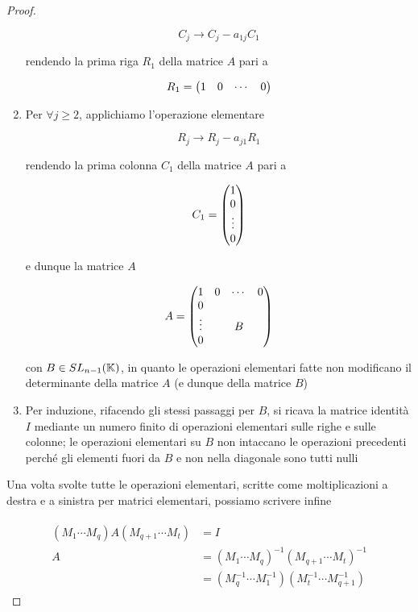 \begin{proof}
\begin{enumerate}
		\begin{equation}
			C_{j} \to C_{j} - a_{1j} C_{1}
		\end{equation}
	
		rendendo la prima riga $ R_{1} $ della matrice $ A $ pari a 
		
		\begin{equation}
			R_{1} = \mqty(\dmat{ 1 & 0 & \cdots & 0 })
		\end{equation}
		
		\item Per $ \forall j \geqslant 2 $, applichiamo l'operazione elementare
		
		\begin{equation}
			R_{j} \to R_{j} - a_{j1} R_{1}
		\end{equation}
		
		rendendo la prima colonna $ C_{1} $ della matrice $ A $ pari a 
		
		\begin{equation}
			C_{1} = \mqty(\dmat{ 1 \\ 0 \\ \vdots \\ 0 })
		\end{equation}
	
		e dunque la matrice $ A $
		
		\begin{equation}
			A = %
			\mqty(\dmat{ 1 & 0 & \cdots & 0 \\ %
							0 & & & \\ %
							\vdots & & B &\\ %
							0 & & & })
		\end{equation}
	
		con $ B \in SL_{n-1}(\mathbb{K}) $, in quanto le operazioni elementari fatte non modificano il determinante della matrice $ A $ (e dunque della matrice $ B $)
		
		\item Per induzione, rifacendo gli stessi passaggi per $ B $, si ricava la matrice identità $ I $ mediante un numero finito di operazioni elementari sulle righe e sulle colonne; le operazioni elementari su $ B $ non intaccano le operazioni precedenti perché gli elementi fuori da $ B $ e non nella diagonale sono tutti nulli
	\end{enumerate}

	Una volta svolte tutte le operazioni elementari, scritte come moltiplicazioni a destra e a sinistra per matrici elementari, possiamo scrivere infine
	
	\begin{align}
		\begin{split}
			(M_{1} \cdots M_{q}) A (M_{q+1} \cdots M_{t}) &= I\\
			A &= (M_{1} \cdots M_{q})^{-1} (M_{q+1} \cdots M_{t})^{-1}\\
			&= (M_{q}^{-1} \cdots M_{1}^{-1}) (M_{t}^{-1} \cdots M_{q+1}^{-1})
		\end{split}
	\end{align}
\end{proof}

